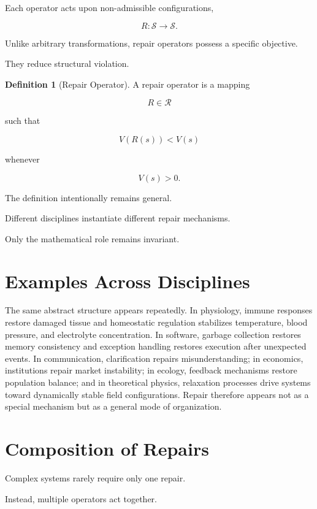 \documentclass[11pt,oneside]{book}
\numberwithin{equation}{chapter}
\theoremstyle{definition}
\newtheorem{definition}{Definition}[chapter]
\theoremstyle{plain}
\newcommand{\State}{\mathcal{S}}
\newcommand{\Repair}{\mathcal{R}}
\begin{document}
Each operator acts upon non-admissible configurations,

\[
R :
\State
\rightarrow
\State.
\]

Unlike arbitrary transformations, repair operators possess a specific
objective.

They reduce structural violation.

\begin{definition}[Repair Operator]

A repair operator is a mapping

\[
R \in \Repair
\]

such that

\[
V(R(s))
<
V(s)
\]

whenever

\[
V(s) > 0.
\]

\end{definition}

The definition intentionally remains general.

Different disciplines instantiate different repair mechanisms.

Only the mathematical role remains invariant.

\section{Examples Across Disciplines}

The same abstract structure appears repeatedly. In physiology, immune responses restore damaged tissue and homeostatic regulation stabilizes temperature, blood pressure, and electrolyte concentration. In software, garbage collection restores memory consistency and exception handling restores execution after unexpected events. In communication, clarification repairs misunderstanding; in economics, institutions repair market instability; in ecology, feedback mechanisms restore population balance; and in theoretical physics, relaxation processes drive systems toward dynamically stable field configurations. Repair therefore appears not as a special mechanism but as a general mode of organization.

\section{Composition of Repairs}

Complex systems rarely require only one repair.

Instead, multiple operators act together.
\end{document}
